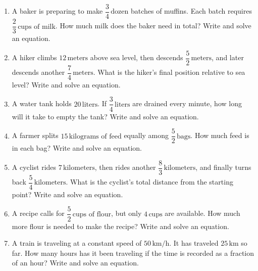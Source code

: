 \documentclass[12pt]{article}
\begin{document}
\begin{tcolorbox}[colframe=black!60, colback=white, 
coltitle=black, colbacktitle=black!15, fonttitle=\bfseries\Large, 
title=Problems, halign title=center, left=10pt, right=10pt, top=10pt, bottom=70pt]
\begin{enumerate}[itemsep=2.5em]
    \item A baker is preparing to make \( \dfrac{3}{4} \, \text{dozen} \) batches of muffins. Each batch requires \( \dfrac{2}{3} \, \text{cups of milk} \). How much milk does the baker need in total? Write and solve an equation.

    \item A hiker climbs \( 12 \, \text{meters} \) above sea level, then descends \( \dfrac{5}{2} \, \text{meters} \), and later descends another \( \dfrac{7}{4} \, \text{meters} \). What is the hiker’s final position relative to sea level? Write and solve an equation.

    \item A water tank holds \( 20 \, \text{liters} \). If \( \dfrac{3}{4} \, \text{liters} \) are drained every minute, how long will it take to empty the tank? Write and solve an equation.

    \item A farmer splits \( 15 \, \text{kilograms of feed} \) equally among \( \dfrac{5}{2} \, \text{bags} \). How much feed is in each bag? Write and solve an equation.

    \item A cyclist rides \( 7 \, \text{kilometers} \), then rides another \( \dfrac{8}{3} \, \text{kilometers} \), and finally turns back \( \dfrac{5}{4} \, \text{kilometers} \). What is the cyclist’s total distance from the starting point? Write and solve an equation.

    \item A recipe calls for \( \dfrac{5}{2} \, \text{cups of flour} \), but only \( 4 \, \text{cups} \) are available. How much more flour is needed to make the recipe? Write and solve an equation.

    \item A train is traveling at a constant speed of \( 50 \, \text{km/h} \). It has traveled \( 25 \, \text{km} \) so far. How many hours has it been traveling if the time is recorded as a fraction of an hour? Write and solve an equation.
  
\end{enumerate}
\end{tcolorbox}
\end{document}
